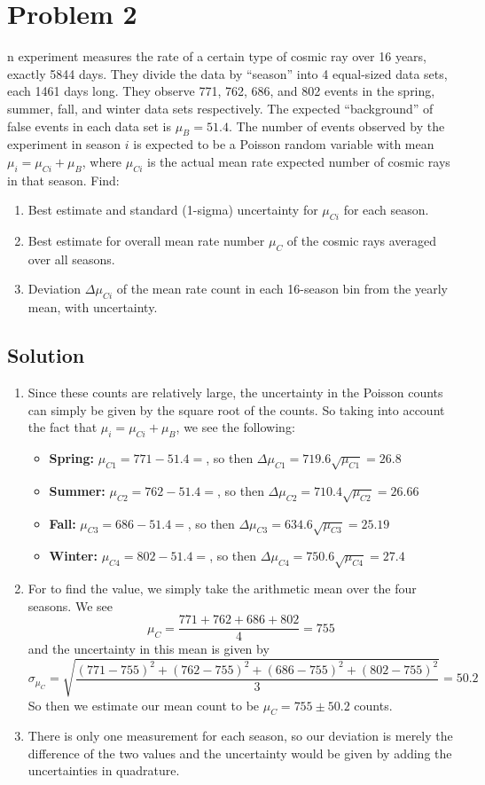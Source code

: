 \documentclass[]{article}
\newcommand{\bd}{\textbf}
\begin{document}
	\section*{Problem 2}
		n experiment measures the rate of a certain type of cosmic ray over 16 years, exactly
		5844 days. They divide the data by “season” into 4 equal-sized data sets, each 1461
		days long. They observe 771, 762, 686, and 802 events in the spring, summer, fall,
		and winter data sets respectively. The expected “background” of false events in each
		data set is $\mu_B = 51.4$. The number of events observed by the experiment in season $i$ is
		expected to be a Poisson random variable with mean $\mu_i = \mu_{Ci} + \mu_B$, where $\mu_{Ci}$ is the
		actual mean rate expected number of cosmic rays in that season. Find:
		\begin{enumerate}[label = \bd{(\alph*)}]
			\item Best estimate and standard (1-sigma) uncertainty for $\mu_{Ci}$ for each season.
			\item Best estimate for overall mean rate number $\mu_C$ of the cosmic rays averaged over all seasons.
			\item Deviation $\Delta \mu_{Ci}$ of the mean rate count in each 16-season bin from the yearly
			mean, with uncertainty.
		\end{enumerate}
		\subsection*{Solution}
			\begin{enumerate}[label = \bd{(\alph*)}]
				\item Since these counts are relatively large, the uncertainty in the Poisson counts can simply be given by the square root of the counts. So taking into account the fact that $\mu_i = \mu_{Ci} + \mu_B$, we see the following:
				\begin{itemize}
					\item\bd{Spring:} $\mu_{C1} = 771- 51.4 = $, so then $\Delta \mu_{C1} =719.6 \sqrt{\mu_{C1}} = 26.8$
					\item \bd{Summer:} $\mu_{C2} = 762- 51.4 = $, so then $\Delta \mu_{C2} = 710.4 \sqrt{\mu_{C2}} = 26.66$
					\item \bd{Fall:} $\mu_{C3} = 686- 51.4 = $, so then $\Delta \mu_{C3} = 634.6 \sqrt{\mu_{C3}} = 25.19$
					\item \bd{Winter:} $\mu_{C4} = 802- 51.4 = $, so then $\Delta \mu_{C4} =750.6 \sqrt{\mu_{C4}} = 27.4$
				\end{itemize}
				\item For to find the value, we simply take the arithmetic mean over the four seasons. We see
				\[
					\mu_C = \frac{771+762+686+802}{4}=755
				\]
				and the uncertainty in this mean is given by
				\[
					\sigma_{\mu_C} = \sqrt{\frac{(771- 755)^2+(762-755)^2+(686-755)^2+(802- 755)^2}{3}} = 50.2
				\]
				So then we estimate our mean count to be $\mu_C = 755 \pm 50.2$ counts.
				\item 
				There is only one measurement for each season, so our deviation is merely the difference of the two values and the uncertainty would be given by adding the uncertainties in quadrature.
			\end{enumerate}
\end{document}
